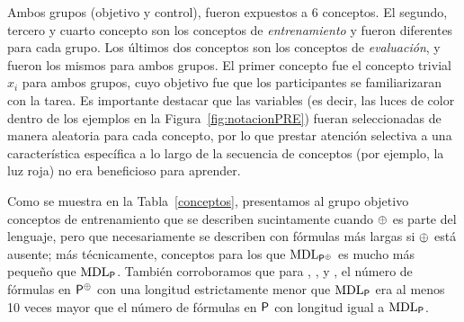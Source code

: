 Ambos grupos (objetivo y control), fueron expuestos a 6 conceptos. El segundo, tercero y cuarto concepto son los conceptos de {\em entrenamiento} y fueron diferentes para cada grupo. Los últimos dos conceptos son los conceptos de {\em evaluación}, y fueron los mismos para ambos grupos. El primer concepto fue el concepto trivial $x_i$ para ambos grupos, cuyo objetivo fue que los participantes se familiarizaran con la tarea. Es importante destacar que las variables (es decir, las luces de color dentro de los ejemplos en la Figura~\ref{fig:notacionPRE}) fueran seleccionadas de manera aleatoria para cada concepto, por lo que prestar atención selectiva a una característica específica a lo largo de la secuencia de conceptos (por ejemplo, la luz roja) no era beneficioso para aprender.


Como se muestra en la Tabla~\ref{conceptos}, presentamos al grupo objetivo conceptos de entrenamiento que se describen sucintamente cuando $\oplus$ es parte del lenguaje, pero que necesariamente se describen con fórmulas más largas si $\oplus$ está ausente; más técnicamente, conceptos para los que ${\rm MDL}_{{\sf P}^\oplus}$ es mucho más pequeño que ${\rm MDL}_{{\sf P}}$. También corroboramos que para \targetb, \targetc, \targetd y \testa, el número de fórmulas en ${\sf P}^\oplus$ con una longitud estrictamente menor que ${\rm MDL}_{{\sf P}}$ era al menos 10 veces mayor que el número de fórmulas en ${\sf P}$ con longitud igual a ${\rm MDL}_{{\sf P}}$.


